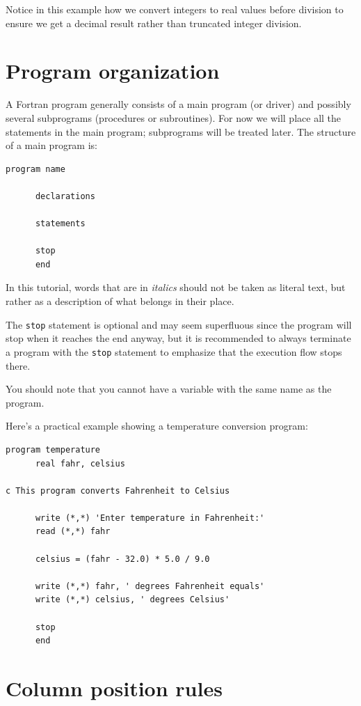 Notice in this example how we convert integers to real values before division to ensure we get a decimal result rather than truncated integer division.

\section{Program organization}

A Fortran program generally consists of a main program (or driver) and possibly several subprograms (procedures or subroutines). For now we will place all the statements in the main program; subprograms will be treated later. The structure of a main program is:

\begin{lstlisting}[style=fortran77]
      program name

      declarations

      statements

      stop
      end
\end{lstlisting}

In this tutorial, words that are in \emph{italics} should not be taken as literal text, but rather as a description of what belongs in their place.

The \texttt{stop} statement is optional and may seem superfluous since the program will stop when it reaches the end anyway, but it is recommended to always terminate a program with the \texttt{stop} statement to emphasize that the execution flow stops there.

You should note that you cannot have a variable with the same name as the program.

Here's a practical example showing a temperature conversion program:

\begin{lstlisting}[style=fortran77]
      program temperature
      real fahr, celsius
      
c This program converts Fahrenheit to Celsius
      
      write (*,*) 'Enter temperature in Fahrenheit:'
      read (*,*) fahr
      
      celsius = (fahr - 32.0) * 5.0 / 9.0
      
      write (*,*) fahr, ' degrees Fahrenheit equals'
      write (*,*) celsius, ' degrees Celsius'
      
      stop
      end
\end{lstlisting}

\section{Column position rules}

